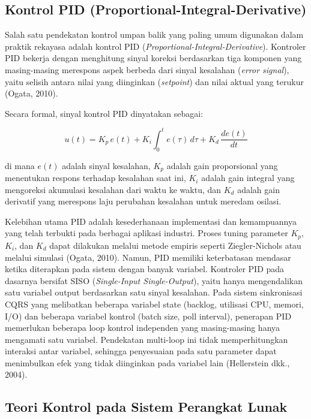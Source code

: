 \subsection{Kontrol PID (Proportional-Integral-Derivative)}

Salah satu pendekatan kontrol umpan balik yang paling umum digunakan dalam praktik rekayasa adalah kontrol PID (\emph{Proportional-Integral-Derivative}).
Kontroler PID bekerja dengan menghitung sinyal koreksi berdasarkan tiga komponen yang masing-masing merespons aspek berbeda dari sinyal kesalahan (\emph{error signal}), yaitu selisih antara nilai yang diinginkan (\emph{setpoint}) dan nilai aktual yang terukur (Ogata, 2010).

Secara formal, sinyal kontrol PID dinyatakan sebagai:

\begin{equation}
u(t) = K_p \, e(t) + K_i \int_0^t e(\tau) \, d\tau + K_d \, \frac{de(t)}{dt}
\label{eq:pid}
\end{equation}

di mana $e(t)$ adalah sinyal kesalahan, $K_p$ adalah gain proporsional yang menentukan respons terhadap kesalahan saat ini, $K_i$ adalah gain integral yang mengoreksi akumulasi kesalahan dari waktu ke waktu, dan $K_d$ adalah gain derivatif yang merespons laju perubahan kesalahan untuk meredam osilasi.

Kelebihan utama PID adalah kesederhanaan implementasi dan kemampuannya yang telah terbukti pada berbagai aplikasi industri.
Proses tuning parameter $K_p$, $K_i$, dan $K_d$ dapat dilakukan melalui metode empiris seperti Ziegler-Nichols atau melalui simulasi (Ogata, 2010).
Namun, PID memiliki keterbatasan mendasar ketika diterapkan pada sistem dengan banyak variabel.
Kontroler PID pada dasarnya bersifat SISO (\emph{Single-Input Single-Output}), yaitu hanya mengendalikan satu variabel output berdasarkan satu sinyal kesalahan.
Pada sistem sinkronisasi CQRS yang melibatkan beberapa variabel state (backlog, utilisasi CPU, memori, I/O) dan beberapa variabel kontrol (batch size, poll interval), penerapan PID memerlukan beberapa loop kontrol independen yang masing-masing hanya mengamati satu variabel.
Pendekatan multi-loop ini tidak memperhitungkan interaksi antar variabel, sehingga penyesuaian pada satu parameter dapat menimbulkan efek yang tidak diinginkan pada variabel lain (Hellerstein dkk., 2004).

\subsection{Teori Kontrol pada Sistem Perangkat Lunak}

